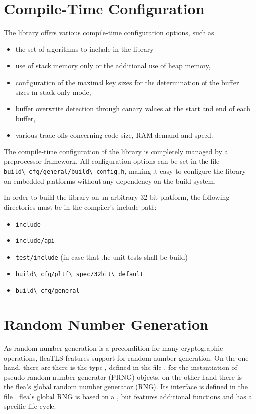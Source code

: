 \documentclass[a4paper,11pt]{scrartcl}
\begin{document}
  \section{Compile-Time Configuration}

The library offers various compile-time
configuration options, such as 
\begin{itemize}
  \item the set of algorithms to include in the library
  \item use of stack memory only or the additional use of heap memory,
  \item configuration of the maximal key sizes for the determination of the
    buffer sizes in stack-only mode,
  \item buffer overwrite detection through canary values at the start and end of
    each buffer,
  \item various trade-offs concerning code-size, RAM demand and speed.
  \end{itemize}

  The compile-time configuration of the library is completely managed by a
  preprocessor framework. All configuration options can be set in the file
  \verb#build\_cfg/general/build\_config.h#, making it easy to configure the
  library on embedded platforms without any dependency on the build system.

  In order to build the library on an arbitrary 32-bit platform, the following
  directories must be in the compiler's include path:
  \begin{itemize}
    \item \verb#include#
    \item \verb#include/api#
    \item \verb#test/include# (in case that the unit tests shall be build)
    \item \verb#build\_cfg/pltf\_spec/32bit\_default#
    \item \verb#build\_cfg/general#
  \end{itemize}

\section{Random Number Generation }
\label{secRng}

As random number generation is a precondition for many cryptographic operations,
fleaTLS features support for random number generation. On the one hand, there
are there is the type , defined in the file
, for the instantiation of
pseudo random number generator (PRNG) objects, on the other hand there is the flea's
global random number generator (RNG). Its interface is defined in the file
. flea's global RNG is based on a
, but features additional functions and has a
specific life cycle.
\end{document}
